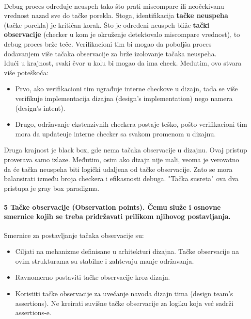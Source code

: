 \documentclass[a4paper, 12pt]{article}
\begin{document}
\\\indent Debug proces određuje neuspeh tako što prati miscompare ili neočekivanu vrednost nazad sve do tačke porekla. Stoga, identifikacija \textbf{tačke neuspeha} (tačke porekla) je kritičan korak. Što je određeni neuspeh bliže \textbf{tački observacije} (checker u kom je okruženje detektovalo miscompare vrednost), to debug proces brže teče. Verifikacioni tim bi mogao da poboljša proces dodavanjem više tačaka observacije za brže izolovanje tačaka neuspeha.\\
\indent Idući u krajnost, svaki čvor u kolu bi mogao da ima check. Međutim, ovo stvara više poteškoća:
\begin{itemize}
\item Prvo, ako verifikacioni tim ugrađuje interne checkove u dizajn, tada se više verifikuje implementacija dizajna (design's implementation) nego namera (design's intent).
\item Drugo, održavanje ekstenzivnih checkera postaje teško, pošto verifikacioni tim mora da updateuje interne checker sa svakom promenom u dizajnu.
\end{itemize}
\indent Druga krajnost je black box, gde nema tačaka observacije u dizajnu. Ovaj pristup proverava samo izlaze. Međutim, osim ako dizajn nije mali, veoma je verovatno da će tačka neuspeha biti logički udaljena od tačke observacije. Zato se mora balansirati između broja checkera i efikasnosti debuga. "Tačka susreta" ova dva pristupa je gray box paradigma.
\paragraph{5 Tačke observacije (Observation points). Čemu služe i osnovne smernice kojih se treba pridržavati prilikom njihovog postavljanja.}
\hfill \break
\indent Smernice za postavljanje tačaka observacije su:
\begin{itemize}
\item Ciljati na mehanizme definisane u arhitekturi dizajna. Tačke observacije na ovim strukturama su stabilne i zahtevaju manje održavanja.
\item Ravnomerno postaviti tačke observacije kroz dizajn.
\item Koristiti tačke observacije za uvećanje navoda dizajn tima (design team's assertions). Ne kreirati suvišne tačke observacije za logiku koja već sadrži assertions-e.
\end{itemize}
\end{document}
